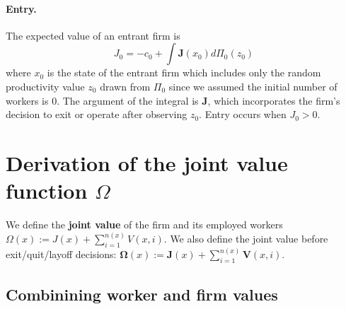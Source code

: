 \paragraph{Entry.}
The expected value of an entrant firm is
\begin{equation}
J_0=-c_{0}+\int \bm{J}\left( x_{0}\right) d\Pi _{0}\left( z_0\right)
\label{eq:D_J0}
\end{equation}%
where $x_{0}$ is the state of the entrant firm which includes only the
random productivity value $z_0$ drawn from $\Pi _{0}$ since we assumed the
initial number of workers is $0$. The argument of the integral is $\bm{J}
$, which incorporates the firm's decision to exit or operate after
observing $z_0$. Entry occurs when $J_0 >0$.


\section{Derivation of the joint value function $\Omega$}
\label{appx:jointvalue_derivation}
We define the \textbf{joint value} of the firm and
its employed workers $\Omega \left( x\right) :=J\left( x\right) +\sum_{i=1}^{n\left(
x\right)}V\left( x,i\right) $. We also define the joint value before exit/quit/layoff
decisions: $\bm{\Omega }\left( x\right) :=\bm{J}\left(
x\right)+\sum_{i=1}^{n\left( x\right) }\bm{V}\left( x,i\right) $.


\subsection{Combinining worker and firm values}


